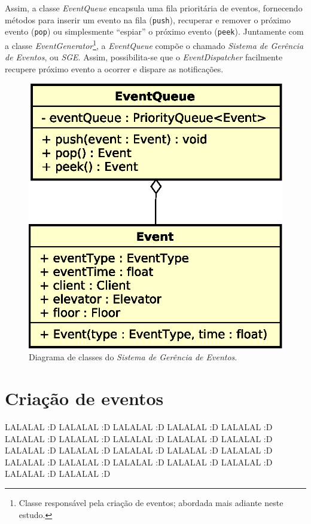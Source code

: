 Assim, a classe \textit{EventQueue} encapsula uma fila prioritária de eventos,
fornecendo métodos para inserir um evento na fila (\texttt{push}), recuperar e
remover o próximo evento (\texttt{pop}) ou simplesmente ``espiar'' o próximo
evento (\texttt{peek}). Juntamente com a classe
\textit{EventGenerator}\footnote{Classe responsável pela criação de eventos;
abordada mais adiante neste estudo.}, a \textit{EventQueue} compõe o chamado
\textit{Sistema de Gerência de Eventos}, ou \textit{SGE}. Assim, possibilita-se
que o \textit{EventDispatcher} facilmente recupere próximo evento a ocorrer e
dispare as notificações.

\begin{figure}[htb!]
  \centering
  \includegraphics[scale=0.6]{img/EventQueue.eps}
  \caption{Diagrama de classes do \textit{Sistema de Gerência de Eventos}.}
\label{fig:diagram:event:manage}
\end{figure}

\section{\label{sec:model:generator}Criação de eventos}

LALALAL :D LALALAL :D LALALAL :D LALALAL :D LALALAL :D LALALAL :D LALALAL :D
LALALAL :D LALALAL :D LALALAL :D LALALAL :D LALALAL :D LALALAL :D LALALAL :D
LALALAL :D LALALAL :D LALALAL :D LALALAL :D LALALAL :D LALALAL :D LALALAL :D
LALALAL :D

